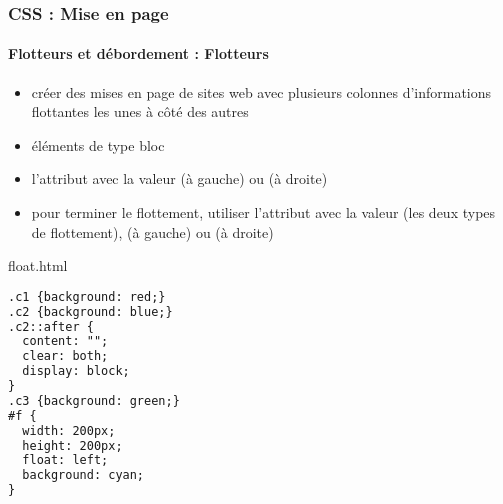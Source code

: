 \documentclass[xcolor=table]{beamer}
\begin{document}
\begin{frame}[fragile]
\frametitle{CSS : Mise en page}
\framesubtitle{Flotteurs et débordement : Flotteurs}

\begin{minipage}{0.60\textwidth}
	\begin{itemize}
		\item créer des mises en page de sites web avec plusieurs colonnes d'informations flottantes les unes à côté des autres
		\item éléments de type bloc
		\item l'attribut  avec la valeur  (à gauche) ou  (à droite)
		\item pour terminer le flottement, utiliser l'attribut  avec la valeur  (les deux types de flottement),  (à gauche) ou  (à droite)
	\end{itemize}
\end{minipage}
%
\begin{minipage}{0.38\textwidth}
	\begin{exampleblock}{float.html}
		\lstset{escapeinside=**}
		\scriptsize\bfseries
\begin{lstlisting}[language={html}]
.c1 {background: red;}
.c2 {background: blue;}
.c2::after {
  content: "";
  clear: both;
  display: block;
}
.c3 {background: green;}
#f {
  width: 200px;
  height: 200px;
  float: left;
  background: cyan;
}
\end{lstlisting}
	\end{exampleblock}
\end{minipage}
\end{frame}
\end{document}
